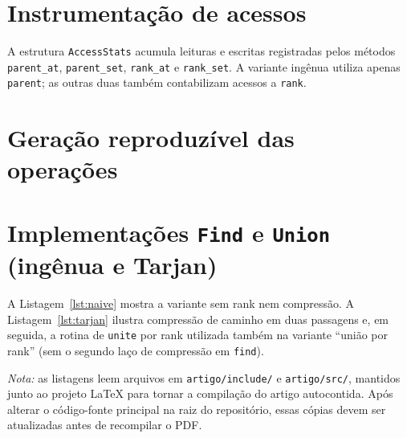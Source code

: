 \section{Instrumentação de acessos}
\label{apendice:stats}

A estrutura \texttt{AccessStats} acumula leituras e escritas registradas pelos métodos \texttt{parent\_at}, \texttt{parent\_set}, \texttt{rank\_at} e \texttt{rank\_set}. A variante ingênua utiliza apenas \texttt{parent}; as outras duas também contabilizam acessos a \texttt{rank}.

\begingroup
{}

\endgroup

\section{Geração reproduzível das operações}
\label{apendice:ops}

\begingroup
{}

\endgroup

\section{Implementações \texttt{Find} e \texttt{Union} (ingênua e Tarjan)}
\label{apendice:dsu}

A Listagem~\ref{lst:naive} mostra a variante sem rank nem compressão. A Listagem~\ref{lst:tarjan} ilustra compressão de caminho em duas passagens e, em seguida, a rotina de \texttt{unite} por rank utilizada também na variante ``união por rank'' (sem o segundo laço de compressão em \texttt{find}).

\begingroup
{}


\endgroup

\noindent\textit{Nota:} as listagens leem arquivos em \texttt{artigo/include/} e \texttt{artigo/src/}, mantidos junto ao projeto \LaTeX{} para tornar a compilação do artigo autocontida. Após alterar o código-fonte principal na raiz do repositório, essas cópias devem ser atualizadas antes de recompilar o PDF.
